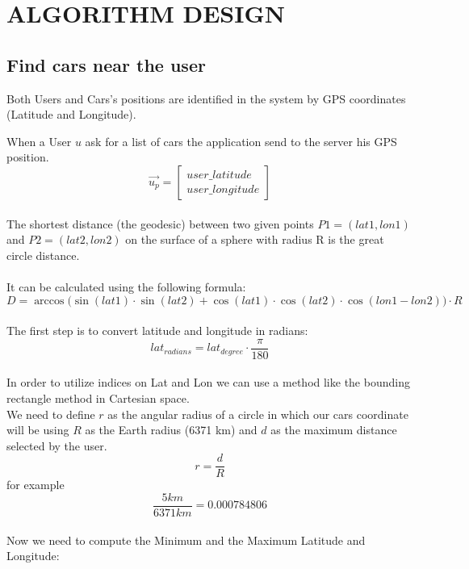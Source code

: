\section{ALGORITHM DESIGN}
\subsection{Find cars near the user}
Both Users and Cars's positions are identified in the system by GPS coordinates (Latitude and Longitude).


\noindent When a User $u$ ask for a list of cars the application send to the server his GPS position. \begin{equation}
\vec{u_p} =\begin{bmatrix}user\_latitude \\ user\_longitude\end{bmatrix}
\end{equation}
\\
\noindent The shortest distance (the geodesic) between two given points $P1=(lat1, lon1)$ and $P2=(lat2, lon2)$ on the surface of a sphere with radius R is the great circle distance. 
\\\\
It can be calculated using the following formula:\\
\begin{equation}
D = \arccos\Big(
\sin(lat1) \cdot \sin(lat2) + \cos(lat1) \cdot \cos(lat2) \cdot \cos(lon1 - lon2)
\Big)\cdot R
\end{equation}
\\
\noindent The first step is to convert latitude and longitude in radians:\\
\begin{equation}
lat_{radians} = lat_{degree} \cdot \frac{\pi}{180}
\end{equation}
\\
In order to utilize indices on Lat and Lon we can use a method like the bounding rectangle method in Cartesian space.\\
\noindent We need to define $r$ as the angular radius of a circle in which our cars coordinate will be using $R$ as the Earth radius (6371 km) and $d$ as the maximum distance selected by the user.
\begin{equation}
	 r = \frac{d}{R}  
\end{equation}
for example $$ \frac{5 km}{6371 km} = 0.000784806$$
\\
\noindent Now we need to compute the Minimum and the Maximum Latitude and Longitude:
